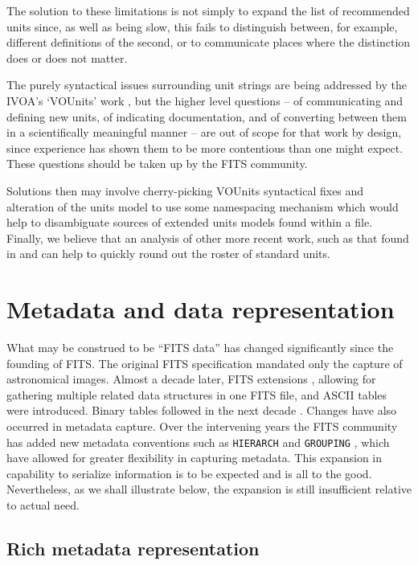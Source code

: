 \documentclass[final,authoryear,5p,times,twocolumn]{elsarticle}
\begin{document}
{{The solution to these limitations is not simply to expand the list of
recommended units since, as well as being slow, this fails to distinguish
between, for example, different definitions of the second, or to communicate 
places where the distinction does or does not matter.

The purely syntactical issues surrounding unit strings are
being addressed by the IVOA's `VOUnits' work \citep{VOUnits}, but the higher
level questions -- of communicating and defining new units, of
indicating documentation, and of converting between them in a
scientifically meaningful manner -- are out of scope for that work by
design, since experience has shown them to be more contentious than
one might expect. These questions should be taken up by the FITS community.

Solutions then may involve cherry-picking VOUnits syntactical fixes and 
alteration of the units model to use some namespacing mechanism which 
would help to disambiguate sources of extended units models found within a file.
Finally, we believe that an analysis of other more recent work, such as that
found in \citeauthor{VOUnits} and \citeauthor{2000CDSUnits} can help to quickly
round out the roster of standard units.


\section{Metadata and data representation}
\label{section_inflex_represent}


What may be construed to be ``FITS data'' has changed significantly
since the founding of FITS. The original FITS specification mandated
only the capture of astronomical images. Almost a decade later, FITS
extensions \citep{1988A&AS...73..359G}, allowing for gathering
multiple related data structures in one FITS file, and ASCII tables
\citep{1988A&AS...73..365H} were introduced. Binary tables followed in
the next decade \citep{1995A&AS..113..159C}. Changes have also
occurred in metadata capture. Over the intervening years the FITS
community has added new metadata conventions such as \texttt{HIERARCH}
\citep{2009Wic} and \texttt{GROUPING} \citep{2007Jen,1995ASPC...77..229J}, which have
allowed for greater flexibility in capturing metadata.
This expansion in capability to serialize information is to be
expected and is all to the good. Nevertheless, as we shall illustrate
below, the expansion is still insufficient relative to actual need.


\subsection{Rich metadata representation}
\label{subsection_information_representation}


}}
\end{document}
